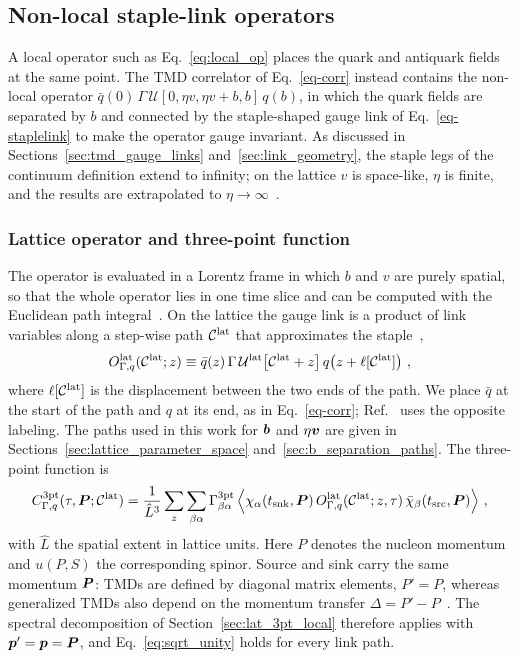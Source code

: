 \subsection{Non-local staple-link operators}
\label{sec:lat_staple}

A local operator such as Eq.~\eqref{eq:local_op} places the quark and antiquark fields at the same point. The TMD correlator of Eq.~\eqref{eq-corr} instead contains the non-local operator $\bar q(0)\,\Gamma\,\mathcal U[0,\eta v,\eta v+b,b]\,q(b)$, in which the quark fields are separated by $b$ and connected by the staple-shaped gauge link of Eq.~\eqref{eq-staplelink} to make the operator gauge invariant. As discussed in Sections~\ref{sec:tmd_gauge_links} and~\ref{sec:link_geometry}, the staple legs of the continuum definition extend to infinity; on the lattice $v$ is space-like, $\eta$ is finite, and the results are extrapolated to $\eta\to\infty$~\cite{Boussarie:2023izj,Yoon:2017qzo}.

\subsubsection{Lattice operator and three-point function}
The operator is evaluated in a Lorentz frame in which $b$ and $v$ are purely spatial, so that the whole operator lies in one time slice and can be computed with the Euclidean path integral~\cite{Musch:2011er, Yoon:2017qzo}. On the lattice the gauge link is a product of link variables along a step-wise path $\mathcal C^{\rm lat}$ that approximates the staple~\cite{MuschThesis2},
\begin{equation}
    O^{\rm lat}_{\Gamma,q}(\mathcal C^{\rm lat};z)\equiv\bar q(z)\,\Gamma\,\mathcal U^{\rm lat}\big[\mathcal C^{\rm lat}+z\big]\,q\big(z+\ell[\mathcal C^{\rm lat}]\big) \ ,
    \label{eq:lattice_staple_op}
\end{equation}
where $\ell[\mathcal C^{\rm lat}]$ is the displacement between the two ends of the path. We place $\bar q$ at the start of the path and $q$ at its end, as in Eq.~\eqref{eq-corr}; Ref.~\cite{MuschThesis2} uses the opposite labeling. The paths used in this work for $\boldsymbol{b}$ and $\eta\boldsymbol{v}$ are given in Sections~\ref{sec:lattice_parameter_space} and~\ref{sec:b_separation_paths}. The three-point function is~\cite{MuschThesis2}
\begin{equation}
    C^{\rm 3pt}_{\Gamma,q}(\tau,\boldsymbol{P};\mathcal C^{\rm lat})=\frac{1}{\hat L^3}\sum_{z}\sum_{\beta\alpha}\Gamma^{\rm 3pt}_{\beta\alpha}\,\Big\langle\chi_\alpha(t_{\rm snk},\boldsymbol{P})\,O^{\rm lat}_{\Gamma,q}(\mathcal C^{\rm lat};z,\tau)\,\bar\chi_\beta(t_{\rm src},\boldsymbol{P})\Big\rangle \ ,
    \label{eq:staple_3pt}
\end{equation}
with $\hat L$ the spatial extent in lattice units. Here $P$ denotes the nucleon momentum and $u(P,S)$ the corresponding spinor. Source and sink carry the same momentum $\boldsymbol{P}$: TMDs are defined by diagonal matrix elements, $P'=P$, whereas generalized TMDs also depend on the momentum transfer $\Delta=P'-P$~\cite{Boussarie:2023izj}. The spectral decomposition of Section~\ref{sec:lat_3pt_local} therefore applies with $\boldsymbol{p}'=\boldsymbol{p}=\boldsymbol{P}$, and Eq.~\eqref{eq:sqrt_unity} holds for every link path.

